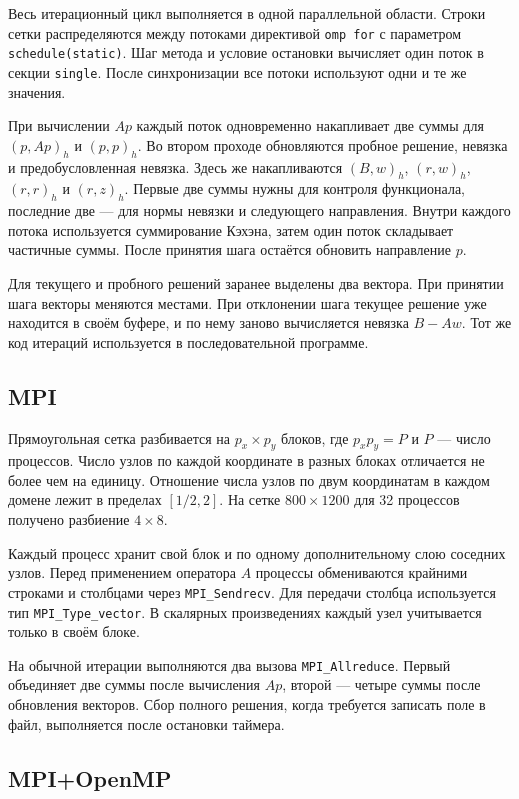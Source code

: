 \documentclass[a4paper,12pt]{extarticle}
\begin{document}
Весь итерационный цикл выполняется в одной параллельной области. Строки сетки распределяются между потоками директивой \texttt{omp for} с параметром \texttt{schedule(static)}. Шаг метода и условие остановки вычисляет один поток в секции \texttt{single}. После синхронизации все потоки используют одни и те же значения.

При вычислении $Ap$ каждый поток одновременно накапливает две суммы для $(p,Ap)_h$ и $(p,p)_h$. Во втором проходе обновляются пробное решение, невязка и предобусловленная невязка. Здесь же накапливаются $(B,w)_h$, $(r,w)_h$, $(r,r)_h$ и $(r,z)_h$. Первые две суммы нужны для контроля функционала, последние две --- для нормы невязки и следующего направления. Внутри каждого потока используется суммирование Кэхэна, затем один поток складывает частичные суммы. После принятия шага остаётся обновить направление $p$.

Для текущего и пробного решений заранее выделены два вектора. При принятии шага векторы меняются местами. При отклонении шага текущее решение уже находится в своём буфере, и по нему заново вычисляется невязка $B-Aw$. Тот же код итераций используется в последовательной программе.

\subsection{MPI}

Прямоугольная сетка разбивается на $p_x\times p_y$ блоков, где $p_xp_y=P$ и $P$ --- число процессов. Число узлов по каждой координате в разных блоках отличается не более чем на единицу. Отношение числа узлов по двум координатам в каждом домене лежит в пределах $[1/2,2]$. На сетке $800\times1200$ для 32 процессов получено разбиение $4\times8$.

Каждый процесс хранит свой блок и по одному дополнительному слою соседних узлов. Перед применением оператора $A$ процессы обмениваются крайними строками и столбцами через \texttt{MPI\_Sendrecv}. Для передачи столбца используется тип \texttt{MPI\_Type\_vector}. В скалярных произведениях каждый узел учитывается только в своём блоке.

На обычной итерации выполняются два вызова \texttt{MPI\_Allreduce}. Первый объединяет две суммы после вычисления $Ap$, второй --- четыре суммы после обновления векторов. Сбор полного решения, когда требуется записать поле в файл, выполняется после остановки таймера.

\subsection{MPI+OpenMP}
\end{document}
